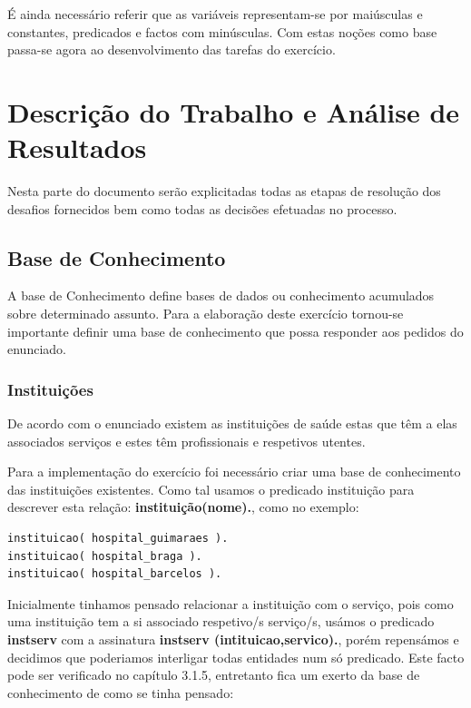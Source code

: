 É ainda necessário referir que as variáveis representam-se por maiúsculas e constantes, predicados e factos com minúsculas.
Com estas noções como base passa-se agora ao desenvolvimento das tarefas do exercício.


\chapter{Descrição do Trabalho e Análise de Resultados}
\label{cap:p3}

Nesta parte do documento serão explicitadas todas as etapas de resolução dos desafios fornecidos bem como todas as decisões efetuadas no processo.


\section{Base de Conhecimento}
\label{p3:baseConhe}

A base de Conhecimento define bases de dados ou conhecimento acumulados sobre determinado assunto.
Para a elaboração deste exercício tornou-se importante definir uma base de conhecimento
que possa responder aos pedidos do enunciado.

\subsection{Instituições}

De acordo com o enunciado existem as instituições de saúde estas que têm a elas associados serviços e estes têm profissionais e respetivos utentes. 

Para a implementação do exercício foi necessário criar uma base de conhecimento das instituições existentes. 
Como tal usamos o predicado instituição para descrever esta relação: \textbf{instituição(nome).}, como no exemplo: 

\begin{verbatim}
instituicao( hospital_guimaraes ). 
instituicao( hospital_braga ).
instituicao( hospital_barcelos ).
\end{verbatim}

Inicialmente tinhamos pensado relacionar a instituição com o serviço, pois como uma instituição tem a si associado respetivo/s serviço/s, usámos o predicado \textbf{instserv} com a  assinatura \textbf{instserv (intituicao,servico).}, porém repensámos e decidimos que poderiamos interligar todas entidades num só predicado. Este facto pode ser verificado no capítulo 3.1.5, entretanto fica um exerto da base de conhecimento de como se tinha pensado: 


